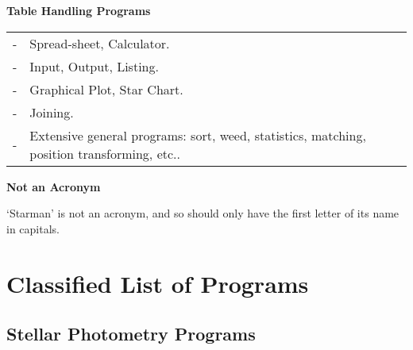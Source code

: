 {\vspace*{1mm} \large \bf Table Handling Programs \vspace*{-1mm} }

\hspace*{3ex} \begin{tabular}{lp{5.5in}}
- & Spread-sheet, Calculator. \\
- & Input, Output, Listing. \\
- & Graphical Plot, Star Chart. \\
- & Joining. \\
- & Extensive general programs: sort, weed, statistics,
    matching, position transforming, etc.. \\
\end{tabular}


{\vspace*{1mm} \large \bf Not an Acronym \vspace*{-1mm} }

\vspace*{0.2mm}
`Starman' is not an acronym, and so should only have the first letter of
its name in capitals.


\newpage

\phantom{aa}

\newpage

\tableofcontents
\setlength{\parskip}{\medskipamount}
\markright{\stardocname}

\newpage

\section{Classified List of Programs}
\label{se:class}

\subsection{Stellar Photometry Programs}

